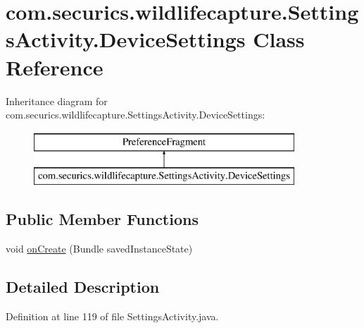 \hypertarget{classcom_1_1securics_1_1wildlifecapture_1_1_settings_activity_1_1_device_settings}{\section{com.\+securics.\+wildlifecapture.\+Settings\+Activity.\+Device\+Settings Class Reference}
\label{classcom_1_1securics_1_1wildlifecapture_1_1_settings_activity_1_1_device_settings}
}
Inheritance diagram for com.\+securics.\+wildlifecapture.\+Settings\+Activity.\+Device\+Settings\+:\begin{figure}[H]
\begin{center}
\leavevmode
\includegraphics[height=2.000000cm]{classcom_1_1securics_1_1wildlifecapture_1_1_settings_activity_1_1_device_settings}
\end{center}
\end{figure}
\subsection*{Public Member Functions}
\begin{DoxyCompactItemize}
\item 
void \hyperlink{classcom_1_1securics_1_1wildlifecapture_1_1_settings_activity_1_1_device_settings_a6ea22d2dab0e58dd6ea47627c0fb9e09}{on\+Create} (Bundle saved\+Instance\+State)
\end{DoxyCompactItemize}


\subsection{Detailed Description}


Definition at line 119 of file Settings\+Activity.\+java.



